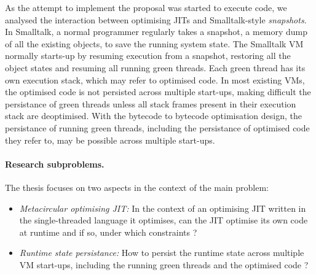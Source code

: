 \documentclass[a4paper,12pt,twoside]{../includes/ThesisStyle}
\begin{document}
As the attempt to implement the proposal was started to execute code, we analysed the interaction between optimising JITs and Smalltalk-style \emph{snapshots}. In Smalltalk, a normal programmer regularly takes a snapshot, a memory dump of all the existing objects, to save the running system state. The Smalltalk VM normally starts-up by resuming execution from a snapshot, restoring all the object states and resuming all running green threads. Each green thread has its own execution stack, which may refer to optimised code. In most existing VMs, the optimised code is not persisted across multiple start-ups, making difficult the persistance of green threads unless all stack frames present in their execution stack are deoptimised. With the bytecode to bytecode optimisation design, the persistance of running green threads, including the persistance of optimised code they refer to, may be possible across multiple start-ups.


\paragraph{Research subproblems.}The thesis focuses on 
two %
aspects in the context of the main problem:
\begin{itemize}
	\item \emph{Metacircular optimising JIT:} In the context of an optimising JIT written in the single-threaded language it optimises, can the JIT optimise its own code at runtime and if so, under which constraints ?
	\item \emph{Runtime state persistance:} How to persist the runtime state across multiple VM start-ups, including the running green threads and the optimised code ?
\end{itemize}
\end{document}
